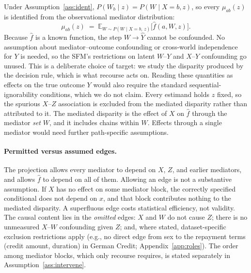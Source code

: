 \noindent Under Assumption~\ref{ass:ident},
$P(W_b\mid z)=P(W\mid X=b,z)$, so every $\mu_{ab}(z)$ is identified from the
observational mediator distribution:
\begin{equation}
  \mu_{ab}(z)\;=\;\mathbb E_{W\sim P(W\mid X=b,\,z)}\bigl[\hat f(a,W,z)\bigr].
  \label{eq:mu_id}
\end{equation}
Because $\hat f$ is a known function, the step $W\to\hat Y$ cannot be
confounded. No assumption about mediator--outcome confounding or cross-world
independence for $Y$ is needed, so the SFM's restrictions on latent $W$--$Y$
and $X$--$Y$ confounding go unused. This is a deliberate choice of target: we
study the disparity produced by the decision rule, which is what recourse acts
on. Reading these quantities as effects on the true outcome $Y$ would also
require the standard sequential-ignorability conditions, which we do not
claim. Every estimand holds $z$ fixed, so the spurious $X$--$Z$ association is
excluded from the mediated disparity rather than attributed to it. The
mediated disparity is the effect of $X$ on $\hat f$ through the mediator
\emph{set} $W$, and it includes chains within $W$. Effects through a single
mediator would need further path-specific assumptions.

\paragraph{Permitted versus assumed edges.}
The projection allows every mediator to depend on $X$, $Z$, and earlier
mediators, and allows $\hat f$ to depend on all of them. Allowing an edge is
not a substantive assumption. If $X$ has no effect on some mediator block, the
correctly specified conditional does not depend on $x$, and that block
contributes nothing to the mediated disparity. A superfluous edge costs
statistical efficiency, not validity. The causal content lies in the
\emph{omitted} edges:
$X$ and $W$ do not cause $Z$;
there is no unmeasured $X$--$W$ confounding given $Z$;
and, where stated, dataset-specific exclusion restrictions apply (e.g.,
no direct edge from sex to the repayment terms (credit amount, duration) in German Credit;
Appendix~\ref{app:roles}).
The order among mediator blocks, which only recourse requires, is stated
separately in Assumption~\ref{ass:intervene}.

